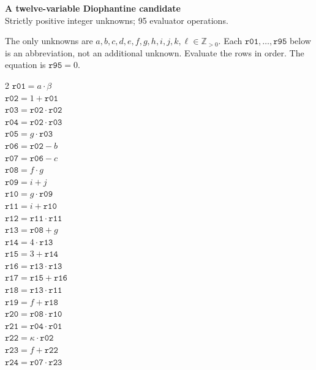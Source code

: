 \documentclass[10pt]{article}
\begin{document}
\begin{center}
{\large\bfseries A twelve-variable Diophantine candidate}\\
{\small Strictly positive integer unknowns; 95 evaluator operations.}
\end{center}
The only unknowns are \(a,b,c,d,e,f,g,h,i,j,k,\ell\in\mathbb Z_{>0}\).
Each \(\mathtt{r01},\ldots,\mathtt{r95}\) below is an abbreviation,
not an additional unknown. Evaluate the rows in order. The equation is
\(\boxed{\mathtt{r95}=0}\).

\begin{multicols}{2}\small
\(\mathtt{r01} = a \cdot \beta\)\\
\(\mathtt{r02} = 1 + \mathtt{r01}\)\\
\(\mathtt{r03} = \mathtt{r02} \cdot \mathtt{r02}\)\\
\(\mathtt{r04} = \mathtt{r02} \cdot \mathtt{r03}\)\\
\(\mathtt{r05} = g \cdot \mathtt{r03}\)\\
\(\mathtt{r06} = \mathtt{r02} - b\)\\
\(\mathtt{r07} = \mathtt{r06} - c\)\\
\(\mathtt{r08} = f \cdot g\)\\
\(\mathtt{r09} = i + j\)\\
\(\mathtt{r10} = g \cdot \mathtt{r09}\)\\
\(\mathtt{r11} = i + \mathtt{r10}\)\\
\(\mathtt{r12} = \mathtt{r11} \cdot \mathtt{r11}\)\\
\(\mathtt{r13} = \mathtt{r08} + g\)\\
\(\mathtt{r14} = 4 \cdot \mathtt{r13}\)\\
\(\mathtt{r15} = 3 + \mathtt{r14}\)\\
\(\mathtt{r16} = \mathtt{r13} \cdot \mathtt{r13}\)\\
\(\mathtt{r17} = \mathtt{r15} + \mathtt{r16}\)\\
\(\mathtt{r18} = \mathtt{r13} \cdot \mathtt{r11}\)\\
\(\mathtt{r19} = f + \mathtt{r18}\)\\
\(\mathtt{r20} = \mathtt{r08} \cdot \mathtt{r10}\)\\
\(\mathtt{r21} = \mathtt{r04} \cdot \mathtt{r01}\)\\
\(\mathtt{r22} = \kappa \cdot \mathtt{r02}\)\\
\(\mathtt{r23} = f + \mathtt{r22}\)\\
\(\mathtt{r24} = \mathtt{r07} \cdot \mathtt{r23}\)\\

\end{multicols}
\end{document}
